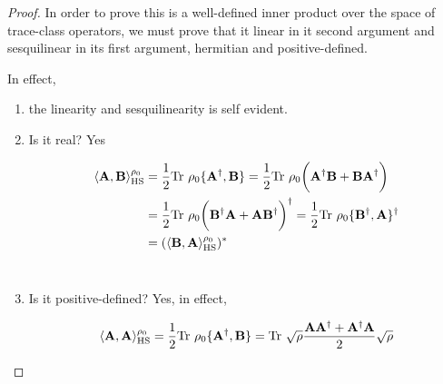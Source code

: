 \documentclass{homework}
\begin{document}
\begin{proof}

In order to prove this is a well-defined inner product over the space of trace-class operators, we must prove that it linear in it second argument and sesquilinear in its first argument, hermitian and positive-defined. 



In effect, 

\begin{enumerate}
    \item the linearity and sesquilinearity is self evident. \\
    \item Is it real? Yes
    
    \begin{equation}
    \begin{split}
        \langle {\bf A}, {\bf B} \rangle_{\textnormal{HS}}^{\rho_0} &= \frac{1}{2}\textnormal{Tr } \rho_0 \{{\bf A}^\dagger, {\bf B}\} = \frac{1}{2} \textnormal{Tr } \rho_0 \bigg({\bf A}^\dagger {\bf B} + {\bf B} {\bf A}^\dagger \bigg)  \\
        &= \frac{1}{2} \textnormal{Tr } \rho_0 \bigg( {\bf B}^\dagger {\bf A}  + {\bf A} {\bf B}^\dagger \bigg)^{\dagger} =  \frac{1}{2}\textnormal{Tr } \rho_0 \{{\bf B}^\dagger, {\bf A}\}^\dagger \\
        &= (\langle {\bf B}, {\bf A} \rangle_{\textnormal{HS}}^{\rho_0})^{*}
        \end{split}
    \end{equation} \\
    
    \item Is it positive-defined? Yes, in effect,
    
    \begin{equation}
        \begin{split}
            \langle {\bf A}, {\bf A} \rangle_{\textnormal{HS}}^{\rho_0}  &=  \frac{1}{2}\textnormal{Tr } \rho_0 \{{\bf A}^\dagger, {\bf B}\} = \textnormal{Tr } \sqrt{\rho} \frac{{\bf A} {\bf A}^{\dagger} + {\bf A}^{\dagger} {\bf A}}{2}\sqrt{\rho} \\
        \end{split}
    \end{equation}
\end{enumerate}
\end{proof}
\end{document}
